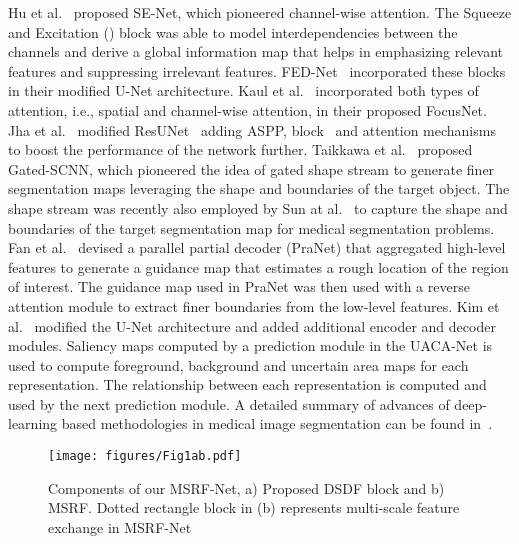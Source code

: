 \documentclass[journal,twoside,web]{IEEEtran}
\begin{document}
Hu et al.~\cite{hu2018squeeze} proposed SE-Net, which pioneered channel-wise attention. The Squeeze and Excitation () block was able to model interdependencies between the channels and derive a global information map that helps in emphasizing relevant features and suppressing irrelevant features. FED-Net~\cite{chen2019feature} incorporated these  blocks in their modified U-Net architecture. Kaul et al.~\cite{kaul2019focusnet} incorporated both types of attention, i.e., spatial and channel-wise attention, in their proposed FocusNet. Jha et al.~\cite{jha2019resunet++} modified ResUNet~\cite{zhang2018road} adding \ac{ASPP},  block~\cite{hu2018squeeze} and attention mechanisms to boost the performance of the network further. Taikkawa et al.~\cite{takikawa2019gated} proposed Gated-SCNN, which pioneered the idea of gated shape stream to generate finer segmentation maps leveraging the shape and boundaries of the target object. The shape stream was recently also employed by Sun at al.~\cite{sun2020saunet} to capture the shape and boundaries of the target segmentation map for medical segmentation problems. Fan et al.~\cite{fan2020pranet} devised a parallel partial decoder (PraNet) that aggregated high-level features to generate a guidance map that estimates a rough location of the region of interest. The guidance map used in PraNet was then used with a reverse attention module to extract finer boundaries from the low-level features. Kim et al.~\cite{kim2021uacanet} modified the U-Net architecture and added additional encoder and decoder modules. Saliency maps computed by a prediction module in the UACA-Net is used to compute foreground, background and uncertain area maps for each representation. The relationship between each representation is computed and used by the next prediction module. A detailed summary of advances of deep-learning based methodologies in medical image segmentation can be found in~\cite{hesamian2019deep,sarvamangala2021convolutional,liu2020survey}.  

\begin{figure}[t!]
\texttt{[image: figures/Fig1ab.pdf]}
\caption{Components of our MSRF-Net, a) Proposed \acf{DSDF} block and b) \acf{MSRF}. Dotted rectangle block in (b) represents multi-scale feature exchange in MSRF-Net}
\label{fig:smfrdbblock}
\vspace{-5mm}
\end{figure}
\end{document}
